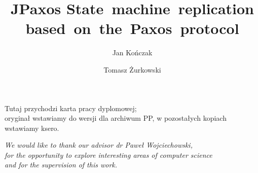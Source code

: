 \documentclass[english,bachelor,a4paper,oneside,12pt]{ppfcmthesis}
\author{%
   Jan Kończak \album{84822} \and 
   Tomasz Żurkowski \album{84915}}
\title{{\Huge JPaxos} \hspace{5em} State~machine~replication based~on~the~Paxos~protocol}
\begin{document}
\frontmatter\pagestyle{empty}%
\maketitle\cleardoublepage%

\thispagestyle{empty}\vspace*{\fill}%
\begin{center}Tutaj przychodzi karta pracy dyplomowej;\\oryginał wstawiamy do wersji dla archiwum PP, w pozostałych kopiach wstawiamy ksero.\end{center}%
\vfill\cleardoublepage%

\thispagestyle{empty}\vspace*{\fill}
\vspace{10cm}
\begin{flushright}\large\textit{We would like to thank our advisor dr Pawe\l{}
Wojciechowski,\\ for the opportunity to explore interesting areas of computer
science\\ and for the supervision of this work.}\end{flushright}%
\vfill\cleardoublepage


\pagestyle{ppfcmthesis}%
\tableofcontents* \cleardoublepage%


\mainmatter%









\cleardoublepage\appendix%
\setcounter{pageTemp}{\value{page}}



\setcounter{page}{\value{pageTemp}}

{\raggedright\sloppy\small}

\ppcolophon
\end{document}
